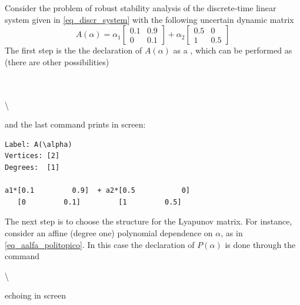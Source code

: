 \documentclass[english,11pt]{article}
\theoremstyle{break} \theorembodyfont{\small\rm}
\begin{document}
Consider the problem of robust stability analysis of the discrete-time linear system given in \eqref{eq_discr_system} with the following uncertain dynamic matrix
\[
A(\alpha)=\alpha_1\begin{bmatrix}0.1 & 0.9 \\0 & 0.1 \end{bmatrix} + \alpha_2\begin{bmatrix}0.5 & 0 \\1 & 0.5 \end{bmatrix}
\]
The first step is the the declaration of $A(\alpha)$ as a , which can be performed as (there are other possibilities)

\vspace{0.5cm}%
\begin{minipage}{8.5cm}
\\
\\
\textbackslash{}	
\end{minipage}
\vspace{0.2cm}

\noindent and the last command prints in screen:

\begin{minipage}{11.2cm}
\begin{lstlisting}[rulecolor=\color{red}]
Label: A(\alpha)
Vertices: [2]
Degrees:  [1]

a1*[0.1         0.9]  + a2*[0.5           0] 
   [0         0.1]         [1         0.5]  
\end{lstlisting}
\end{minipage}

The next step is to choose the structure for the Lyapunov matrix. For instance, consider an affine (degree one) polynomial dependence on $\alpha$, as in \eqref{eq_aalfa_politopico}. In this case the declaration of $P(\alpha)$ is done through the command

\vspace{0.5cm}%
\begin{minipage}{8.5cm}
	\textbackslash{}\\
\end{minipage}
\vspace{0.2cm}

\noindent echoing in screen
\end{document}
